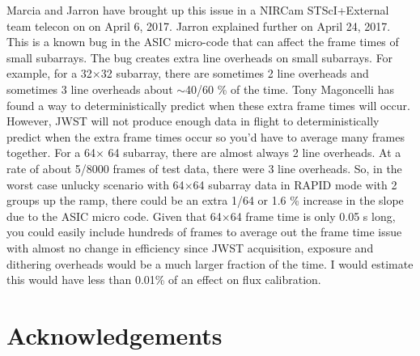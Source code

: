 \documentclass{aastex6}
\begin{document}
Marcia and Jarron have brought up this issue in a NIRCam STScI+External team telecon on on April 6, 2017.
Jarron explained further on April 24, 2017.
This is a known bug in the ASIC micro-code that can affect the frame times of small subarrays.
The bug creates extra line overheads on small subarrays.
For example, for a 32$\times$32 subarray, there are sometimes 2 line overheads and sometimes 3 line overheads about $\sim$40/60 \% of the time.
Tony Magoncelli has found a way to deterministically predict when these extra frame times will occur.
However, JWST will not produce enough data in flight to deterministically predict when the extra frame times occur so you'd have to average many frames together.
For a 64$\times$ 64 subarray, there are almost always 2 line overheads.
At a rate of about 5/8000 frames of test data, there were 3 line overheads.
So, in the worst case unlucky scenario with 64$\times$64 subarray data in RAPID mode with 2 groups up the ramp, there could be an extra 1/64 or 1.6 \% increase in the slope due to the ASIC micro code.
Given that 64$\times$64 frame time is only 0.05 s long, you could easily include hundreds of frames to average out the frame time issue with almost no change in efficiency since JWST acquisition, exposure and dithering overheads would be a much larger fraction of the time.
I would estimate this would have less than 0.01\% of an effect on flux calibration.

\section*{Acknowledgements}
\end{document}
